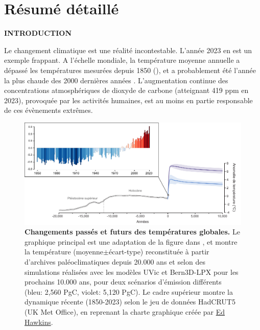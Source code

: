 \section[Résumé détaillé en français]{Résumé détaillé}

\vspace*{1cm}

{\noindent\large\bfseries\sffamily INTRODUCTION}

Le changement climatique est une réalité incontestable. L'année 2023 en est un exemple frappant. A l'échelle mondiale, la température moyenne annuelle a dépassé les températures mesurées depuis 1850 (), et a probablement été l'année la plus chaude des 2000 dernières années \citep{Esper2024}. L'augmentation continue des concentrations atmosphériques de dioxyde de carbone (atteignant 419 ppm en 2023), provoquée par les activités humaines, est au moins en partie responsable de ces évènements extrêmes. 

\begin{figure}
\vspace*{-0cm}
\centering
\includegraphics{resume/figs/clark2016_climatestrips_FR.pdf}
\caption{\textbf{Changements passés et futurs des températures globales.} Le graphique principal est une adaptation de la figure dans \citet{Clark2016}, et montre la température (moyenne$\pm$écart-type) reconstituée à partir d'archives paléoclimatiques depuis 20.000 ans et selon des simulations réalisées avec les modèles UVic et Bern3D-LPX pour les prochains 10.000 ans, pour deux scénarios d'émission différents (bleu: 2,560 PgC, violet: 5,120 PgC). Le cadre supérieur montre la dynamique récente (1850-2023) selon le jeu de données HadCRUT5 (UK Met Office), en reprenant la charte graphique créée par \href{https://showyourstripes.info/}{Ed Hawkins}.}
\vspace*{-0cm}
\label{fig:R1}
\end{figure}


